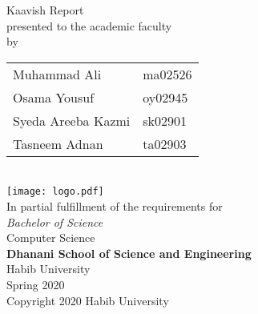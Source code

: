 \hypersetup{pageanchor=false}

\begin{titlepage}
  
  \begin{center}
    \vfill
    \textbf{\Huge \Title}
    \bigskip

    {\large Kaavish Report\\
      presented to the academic faculty\\
      by\\\bigskip
      \begin{tabular}{ll}
        Muhammad Ali & ma02526\\
        Osama Yousuf & \hspace{0.5} oy02945\\
        Syeda Areeba Kazmi & \hspace{0.5} sk02901\\
        Tasneem Adnan & \hspace{0.5} ta02903\\
      \end{tabular}
    }\\\vfill
    \texttt{[image: logo.pdf]}\\
    {\large In partial fulfillment of the requirements for\\
      \textit{Bachelor of Science}\\
      Computer Science\\\medskip
      \textbf{Dhanani School of Science and Engineering}\\\medskip
      Habib University\\\smallskip
      Spring 2020
    }\\\vfill
    Copyright {\scriptsize \textcopyright} 2020 Habib University
  \end{center}
  \restoregeometry
\end{titlepage}
\hypersetup{pageanchor=true}
